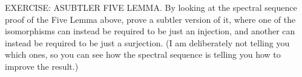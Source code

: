 EXERCISE: ASUBTLER FIVE LEMMA. By looking at the spectral sequence proof of the Five Lemma above, prove a subtler version of it, where one of the isomorphisms can instead be required to be just an injection, and another can instead be required to be just a surjection. (I am deliberately not telling you which ones, so you can see how the spectral sequence is telling you how to improve the result.)

